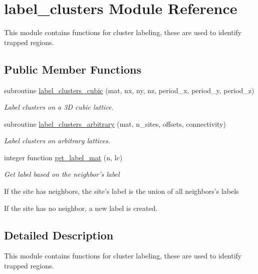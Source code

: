 \hypertarget{classlabel__clusters}{
\section{label\-\_\-clusters \-Module \-Reference}
\label{classlabel__clusters}
}


\-This module contains functions for cluster labeling, these are used to identify trapped regions.  


\subsection*{\-Public \-Member \-Functions}
\begin{DoxyCompactItemize}
\item 
subroutine \hyperlink{classlabel__clusters_ae0e346b0206ffd792328330e1e6c9337}{label\-\_\-clusters\-\_\-cubic} (mat, nx, ny, nz, period\-\_\-x, period\-\_\-y, period\-\_\-z)
\begin{DoxyCompactList}\small\item\em \-Label clusters on a 3\-D cubic lattice. \end{DoxyCompactList}\item 
subroutine \hyperlink{classlabel__clusters_af97342658225cc0c41afea95cfc32fb0}{label\-\_\-clusters\-\_\-arbitrary} (mat, n\-\_\-sites, offsets, connectivity)
\begin{DoxyCompactList}\small\item\em \-Label clusters on arbitrary lattices. \end{DoxyCompactList}\item 
integer function \hyperlink{classlabel__clusters_aa8db8972e6da8009cebd34907a6a5fb4}{get\-\_\-label\-\_\-mat} (n, lc)
\begin{DoxyCompactList}\small\item\em \-Get label based on the neighbor's label \par
 \-If the site has neighbors, the site's label is the union of all neighbors's labels \par
 \-If the site has no neighbor, a new label is created. \end{DoxyCompactList}\end{DoxyCompactItemize}


\subsection{\-Detailed \-Description}
\-This module contains functions for cluster labeling, these are used to identify trapped regions. 


